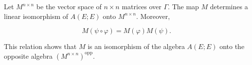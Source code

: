 Let $M^{n \times n}$ be the vector space of $n \times n$ matrices over $\Gamma$. The map $M$ determines a linear isomorphism of $A(E; E)$ onto $M^{n \times n}$. Moreover,

$$M(\psi \circ \varphi) = M(\varphi)M(\psi).$$

This relation shows that $M$ is an isomorphism of the algebra $A(E; E)$ onto the opposite algebra $(M^{n \times n})^{\text{opp}}$.
